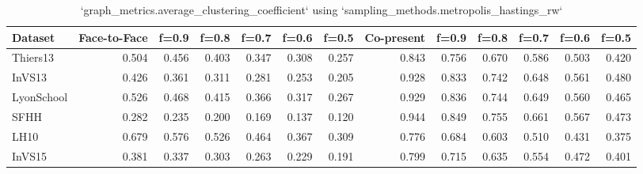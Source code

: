 \begin{table}[ht]
\begin{tabular}{lrrrrrrrrrrrr}
\hline
 Dataset    &   Face-to-Face &   f=0.9 &   f=0.8 &   f=0.7 &   f=0.6 &   f=0.5 &   Co-present &   f=0.9 &   f=0.8 &   f=0.7 &   f=0.6 &   f=0.5 \\
\hline
 Thiers13   &          0.504 &   0.456 &   0.403 &   0.347 &   0.308 &   0.257 &        0.843 &   0.756 &   0.670 &   0.586 &   0.503 &   0.420 \\
 InVS13     &          0.426 &   0.361 &   0.311 &   0.281 &   0.253 &   0.205 &        0.928 &   0.833 &   0.742 &   0.648 &   0.561 &   0.480 \\
 LyonSchool &          0.526 &   0.468 &   0.415 &   0.366 &   0.317 &   0.267 &        0.929 &   0.836 &   0.744 &   0.649 &   0.560 &   0.465 \\
 SFHH       &          0.282 &   0.235 &   0.200 &   0.169 &   0.137 &   0.120 &        0.944 &   0.849 &   0.755 &   0.661 &   0.567 &   0.473 \\
 LH10       &          0.679 &   0.576 &   0.526 &   0.464 &   0.367 &   0.309 &        0.776 &   0.684 &   0.603 &   0.510 &   0.431 &   0.375 \\
 InVS15     &          0.381 &   0.337 &   0.303 &   0.263 &   0.229 &   0.191 &        0.799 &   0.715 &   0.635 &   0.554 &   0.472 &   0.401 \\
\hline
\end{tabular}
\caption{`graph_metrics.average_clustering_coefficient` using `sampling_methods.metropolis_hastings_rw`}
\end{table}